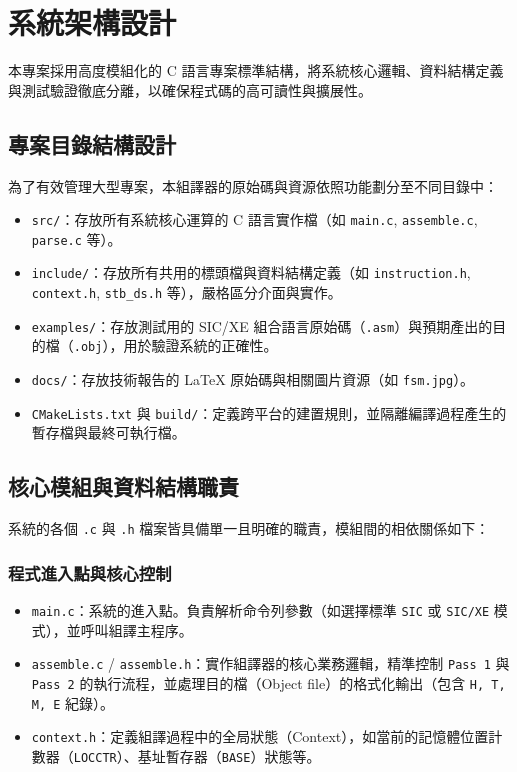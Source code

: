 \chapter{系統架構設計}
本專案採用高度模組化的 C 語言專案標準結構，將系統核心邏輯、資料結構定義與測試驗證徹底分離，以確保程式碼的高可讀性與擴展性。

\section{專案目錄結構設計}
為了有效管理大型專案，本組譯器的原始碼與資源依照功能劃分至不同目錄中：
\begin{itemize}
    \item \lstinline{src/}：存放所有系統核心運算的 C 語言實作檔（如 \lstinline{main.c}, \lstinline{assemble.c}, \lstinline{parse.c} 等）。
    \item \lstinline{include/}：存放所有共用的標頭檔與資料結構定義（如 \lstinline{instruction.h}, \lstinline{context.h}, \lstinline{stb_ds.h} 等），嚴格區分介面與實作。
    \item \lstinline{examples/}：存放測試用的 SIC/XE 組合語言原始碼（\lstinline{.asm}）與預期產出的目的檔（\lstinline{.obj}），用於驗證系統的正確性。
    \item \lstinline{docs/}：存放技術報告的 LaTeX 原始碼與相關圖片資源（如 \lstinline{fsm.jpg}）。
    \item \lstinline{CMakeLists.txt} 與 \lstinline{build/}：定義跨平台的建置規則，並隔離編譯過程產生的暫存檔與最終可執行檔。
\end{itemize}

\section{核心模組與資料結構職責}
系統的各個 \lstinline{.c} 與 \lstinline{.h} 檔案皆具備單一且明確的職責，模組間的相依關係如下：

\subsection{程式進入點與核心控制}
\begin{itemize}
    \item \lstinline{main.c}：系統的進入點。負責解析命令列參數（如選擇標準 \lstinline{SIC} 或 \lstinline{SIC/XE} 模式），並呼叫組譯主程序。
    \item \lstinline{assemble.c} / \lstinline{assemble.h}：實作組譯器的核心業務邏輯，精準控制 \lstinline{Pass 1} 與 \lstinline{Pass 2} 的執行流程，並處理目的檔（Object file）的格式化輸出（包含 \lstinline{H, T, M, E} 紀錄）。
    \item \lstinline{context.h}：定義組譯過程中的全局狀態（Context），如當前的記憶體位置計數器（\lstinline{LOCCTR}）、基址暫存器（\lstinline{BASE}）狀態等。
\end{itemize}

